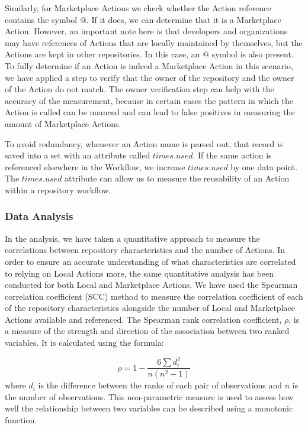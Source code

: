 \documentclass[conference]{IEEEtran}
\begin{document}
Similarly, for Marketplace Actions we check whether the Action reference contains the symbol $@$. If it does, we can determine that it is a Marketplace Action. However, an important note here is that developers and organizations may have references of Actions that are locally maintained by themselves, but the Actions are kept in other repositories. In this case, an $@$ symbol is also present. To fully determine if an Action is indeed a Marketplace Action in this scenario, we have applied a step to verify that the owner of the repository and the owner of the Action do not match. The owner verification step can help with the accuracy of the measurement, because in certain cases the pattern in which the Action is called can be nuanced and can lead to false positives in measuring the amount of Marketplace Actions.
 
            To avoid redundancy, whenever an Action name is parsed out, that record is saved into a set with an attribute called $times.used$. If the same action is referenced elsewhere in the Workflow, we increase $times.used$ by one data point. The $times.used$ attribute can allow us to measure the reusability of an Action within a repository workflow.\\

          \subsubsection{\textbf{Data Analysis}}
            In the analysis, we have taken a quantitative approach to measure the correlations between repository characteristics and the number of Actions. In order to ensure an accurate understanding of what characteristics are correlated to relying on Local Actions more, the same quantitative analysis has been conducted for both Local and Marketplace Actions. We have used the Spearman correlation coefficient (SCC) method to measure the correlation coefficient of each of the repository characteristics alongside the number of Local and Marketplace Actions available and referenced. The Spearman rank correlation coefficient, \(\rho\), is a measure of the strength and direction of the association between two ranked variables. It is calculated using the formula:

            \begin{equation}
            \rho = 1 - \frac{6 \sum d_i^2}{n(n^2 - 1)}
            \end{equation}
where \(d_i\) is the difference between the ranks of each pair of observations and \(n\) is the number of observations. This non-parametric measure is used to assess how well the relationship between two variables can be described using a monotonic function.            
\end{document}
